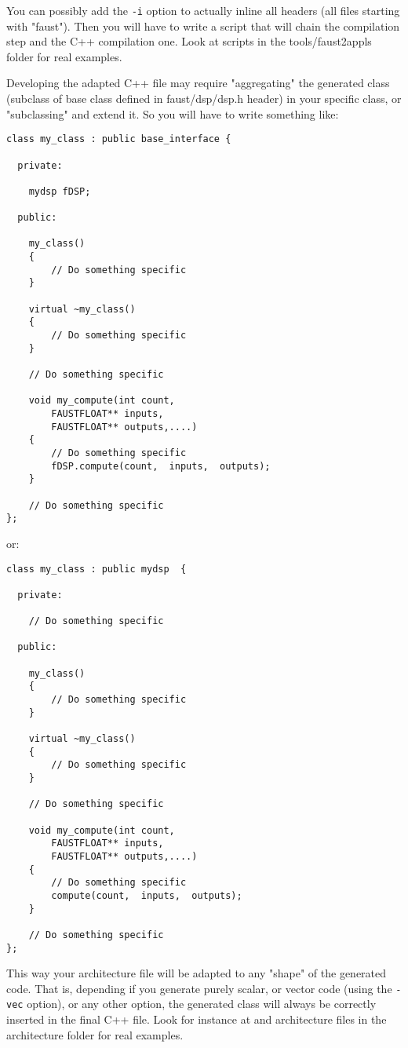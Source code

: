 You can possibly add the \lstinline'-i' option to actually inline all  headers (all files starting with "faust"). Then you will have to write a  script that will chain the \faust compilation step and the C++ compilation one. Look at scripts in the tools/faust2appls folder for real examples. 

Developing the adapted C++ file may require "aggregating" the generated  class (subclass of  base class defined in faust/dsp/dsp.h header) in your specific class, or "subclassing" and extend it.  So you will have to write something like:

\begin{lstlisting}[basicstyle=\ttfamily\footnotesize\color{yotxt}]
class my_class : public base_interface {

  private:
	 
	mydsp fDSP;
		
  public:
  
	my_class()
	{
		// Do something specific
	}
	
	virtual ~my_class()
	{
		// Do something specific
	}
	
	// Do something specific
	
	void my_compute(int count, 
		FAUSTFLOAT** inputs, 
		FAUSTFLOAT** outputs,....)
	{
		// Do something specific
		fDSP.compute(count,  inputs,  outputs);
	}
	
	// Do something specific
};

\end{lstlisting} 

or:

\begin{lstlisting}[basicstyle=\ttfamily\footnotesize\color{yotxt}]
class my_class : public mydsp  {

  private:
  
  	// Do something specific
		
  public:
  
	my_class()
	{
		// Do something specific
	}
	
	virtual ~my_class()
	{
		// Do something specific
	}
	
	// Do something specific
	
	void my_compute(int count, 
		FAUSTFLOAT** inputs, 
		FAUSTFLOAT** outputs,....)
	{
		// Do something specific
		compute(count,  inputs,  outputs);
	}
	
	// Do something specific
};
\end{lstlisting} 

This way your architecture file will be adapted to any "shape" of the generated code. That is, depending if you generate purely scalar, or vector code (using the \lstinline'-vec' option), or any other option, the generated   class will always be correctly inserted in the final C++ file. Look for instance at  and  architecture files in the architecture folder for real examples. 

